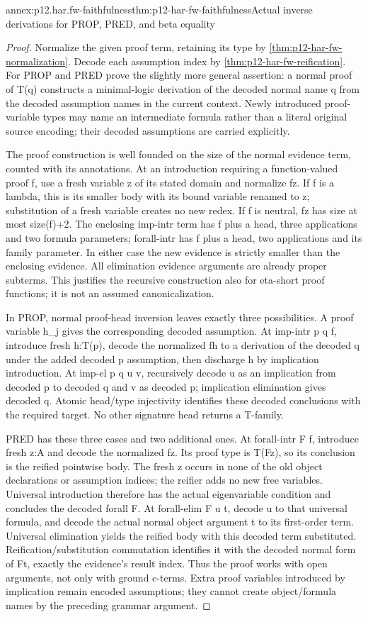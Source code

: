 \begin{annexitem}{annex:p12.har.fw-faithfulness}{thm:p12-har-fw-faithfulness}{Actual inverse derivations for PROP, PRED, and beta equality}
\begin{proof}
Normalize the given proof term, retaining its type by
\cref{thm:p12-har-fw-normalization}. Decode each assumption index
by \cref{thm:p12-har-fw-reification}. For PROP and PRED prove the
slightly more general assertion: a normal proof of T(q) constructs a
minimal-logic derivation of the decoded normal name q from the decoded
assumption names in the current context. Newly introduced proof-variable
types may name an intermediate formula rather than a literal original
source encoding; their decoded assumptions are carried explicitly.

The proof construction is well founded on the size of the normal
evidence term, counted with its annotations. At an introduction requiring
a function-valued proof f, use a fresh variable z of its stated domain
and normalize fz. If f is a lambda, this is its smaller body with
its bound variable renamed to z; substitution of a fresh variable creates
no new redex. If f is neutral, fz has size at most size(f)+2.
The enclosing imp-intr term has f plus a head, three applications and
two formula parameters; forall-intr has f plus a head, two applications
and its family parameter. In either case the new evidence is strictly
smaller than the enclosing evidence. All elimination evidence arguments
are already proper subterms. This justifies the recursive construction
also for eta-short proof functions; it is not an assumed canonicalization.

In PROP, normal proof-head inversion leaves exactly three possibilities.
A proof variable h_j gives the corresponding decoded assumption.
At imp-intr p q f, introduce fresh h:T(p), decode the normalized fh
to a derivation of the decoded q under the added decoded p assumption,
then discharge h by implication introduction. At imp-el p q u v,
recursively decode u as an implication from decoded p to decoded q
and v as decoded p; implication elimination gives decoded q.
Atomic head/type injectivity identifies these decoded conclusions with
the required target. No other signature head returns a T-family.

PRED has these three cases and two additional ones. At forall-intr F f,
introduce fresh z:A and decode the normalized fz. Its proof type is
T(Fz), so its conclusion is the reified pointwise body. The fresh z
occurs in none of the old object declarations or assumption indices;
the reifier adds no new free variables. Universal introduction therefore
has the actual eigenvariable condition and concludes the decoded
forall F. At forall-elim F u t, decode u to that universal formula,
and decode the actual normal object argument t to its first-order term.
Universal elimination yields the reified body with this decoded term
substituted. Reification/substitution commutation identifies it with
the decoded normal form of Ft, exactly the evidence's result index.
Thus the proof works with open arguments, not only with ground c-terms.
Extra proof variables introduced by implication remain encoded assumptions;
they cannot create object/formula names by the preceding grammar argument.


\end{proof}
\end{annexitem}
